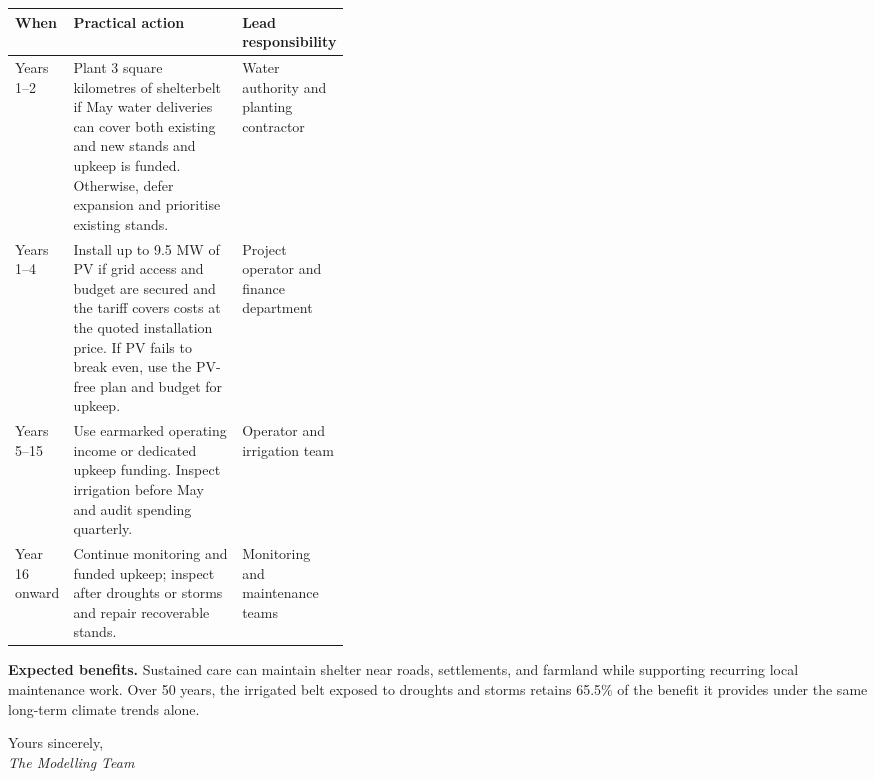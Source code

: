 \vspace{2pt}
\begingroup\footnotesize
\setlength{\tabcolsep}{4pt}\renewcommand{\arraystretch}{1.18}
\begin{tabularx}{\linewidth}{@{}>{\raggedright\arraybackslash}p{0.16\linewidth} >{\raggedright\arraybackslash}X >{\raggedright\arraybackslash}p{0.23\linewidth}@{}}
\toprule
\textbf{When} & \textbf{Practical action} & \textbf{Lead responsibility} \\
\midrule
Years 1--2 & Plant 3 square kilometres of shelterbelt if May water deliveries can cover both existing and new stands and upkeep is funded. Otherwise, defer expansion and prioritise existing stands. & Water authority and planting contractor \\
Years 1--4 & Install up to 9.5 MW of PV if grid access and budget are secured and the tariff covers costs at the quoted installation price. If PV fails to break even, use the PV-free plan and budget for upkeep. & Project operator and finance department \\
Years 5--15 & Use earmarked operating income or dedicated upkeep funding. Inspect irrigation before May and audit spending quarterly. & Operator and irrigation team \\
Year 16 onward & Continue monitoring and funded upkeep; inspect after droughts or storms and repair recoverable stands. & Monitoring and maintenance teams \\
\bottomrule
\end{tabularx}
\endgroup\par
\textbf{Expected benefits.} Sustained care can maintain shelter near roads, settlements, and farmland while supporting recurring local maintenance work. Over 50 years, the irrigated belt exposed to droughts and storms retains 65.5\% of the benefit it provides under the same long-term climate trends alone.\par
\vspace{2pt}
Yours sincerely,\\
\textit{The Modelling Team}
\par\endgroup
\clearpage
